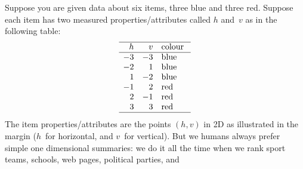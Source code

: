 \begin{example} \label{eg:toypca}
Suppose you are given data about six items, three blue and three red.
Suppose each item has two measured properties\slash attributes called \(h\) and~\(v\) as in the following table:
%
\begin{equation*}
\begin{array}{rrp{3em}}
\hline h&v&colour\\\hline
-3&-3&blue \\
-2&1&blue \\
1&-2&blue \\
-1&2&red \\
2&-1&red \\
3&3&red \\\hline
\end{array}
\end{equation*}
The item properties\slash attributes are the points \((h,v)\) in 2D as illustrated in the margin (\(h\)~for horizontal, and \(v\)~for vertical).
But we humans always prefer simple one dimensional summaries: we do it all the time when we rank sport teams, schools, web pages, political parties, and 


\end{example}
